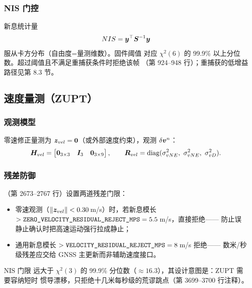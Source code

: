 \subsubsection{NIS 门控}

新息统计量
\begin{equation}
  NIS = \boldsymbol{y}^{\top}\boldsymbol{S}^{-1}\boldsymbol{y}
  \label{eq:nis}
\end{equation}
服从卡方分布（自由度=量测维数）。固件阈值 
对应 $\chi^2(6)$ 的 99.9\% 以上分位数。超过阈值且不满足重捕获条件时拒绝该帧
（第 924--948 行）；重捕获的低增益路径见第 8.3 节。

\subsection{速度量测（ZUPT）}

\subsubsection{观测模型}

零速修正量测为 $\boldsymbol{z}_{vel} = \boldsymbol{0}$（或外部速度约束），观测
$\delta\boldsymbol{v}^n$：
\begin{equation}
  \boldsymbol{H}_{vel} = \begin{bmatrix} \boldsymbol{0}_{3\times3} & \boldsymbol{I}_3 &
    \boldsymbol{0}_{3\times9} \end{bmatrix},
  \qquad
  \boldsymbol{R}_{vel} = \operatorname{diag}(\sigma_{vNE}^2,\ \sigma_{vNE}^2,\ \sigma_{vD}^2).
  \label{eq:H-R-vel}
\end{equation}

\subsubsection{残差防御}

（第 2673--2767 行）设置两道残差门限：
\begin{itemize}
  \item 零速观测（$\|\boldsymbol{z}_{vel}\| < 0.30$\,m/s）时，若新息模长
    $>\texttt{ZERO\_VELOCITY\_RESIDUAL\_REJECT\_MPS}=5.5$\,m/s，直接拒绝——
    防止误静止确认时把高速运动强行拉成静止；
  \item 通用新息模长 $>\texttt{VELOCITY\_RESIDUAL\_REJECT\_MPS}=8$\,m/s 拒绝——
    数米/秒级残差应交给 GNSS 主更新而非辅助速度接口。
\end{itemize}
NIS 门限  远大于
$\chi^2(3)$ 的 99.9\% 分位数（$\approx16.3$），其设计意图是：ZUPT 需要容纳短时
惯导漂移，只拒绝十几米每秒级的荒谬跳点（第 3699--3700 行注释）。

